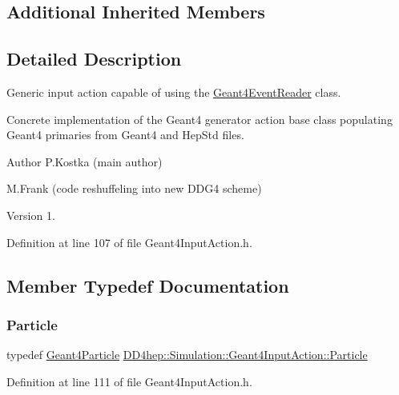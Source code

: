 \subsection*{Additional Inherited Members}


\subsection{Detailed Description}
Generic input action capable of using the \hyperlink{class_d_d4hep_1_1_simulation_1_1_geant4_event_reader}{Geant4\+Event\+Reader} class. 

Concrete implementation of the Geant4 generator action base class populating Geant4 primaries from Geant4 and Hep\+Std files.

\begin{DoxyAuthor}{Author}
P.\+Kostka (main author) 

M.\+Frank (code reshuffeling into new D\+D\+G4 scheme) 
\end{DoxyAuthor}
\begin{DoxyVersion}{Version}
1. 
\end{DoxyVersion}


Definition at line 107 of file Geant4\+Input\+Action.\+h.



\subsection{Member Typedef Documentation}
\hypertarget{class_d_d4hep_1_1_simulation_1_1_geant4_input_action_ab8d227297b50dec5cb769635da56deec}{}\label{class_d_d4hep_1_1_simulation_1_1_geant4_input_action_ab8d227297b50dec5cb769635da56deec} 
\subsubsection{\texorpdfstring{Particle}{Particle}}
{\footnotesize\ttfamily typedef \hyperlink{class_d_d4hep_1_1_simulation_1_1_geant4_particle}{Geant4\+Particle} \hyperlink{class_d_d4hep_1_1_simulation_1_1_geant4_input_action_ab8d227297b50dec5cb769635da56deec}{D\+D4hep\+::\+Simulation\+::\+Geant4\+Input\+Action\+::\+Particle}}



Definition at line 111 of file Geant4\+Input\+Action.\+h.

